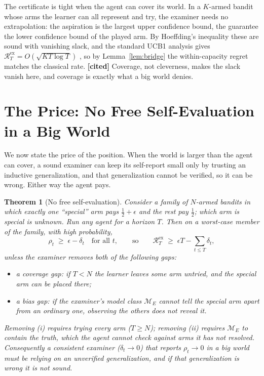 \documentclass[10pt]{article} %
\theoremstyle{definition}
\theoremstyle{plain}
\newtheorem{theorem}{Theorem}
\newcommand{\ModE}{\mathcal{M}_E}
\newcommand{\Rex}{\mathcal{R}^{\mathrm{ex}}}
\begin{document}
The certificate is tight when the agent can cover its world. In a $K$-armed bandit whose arms the learner can all represent and try, the examiner needs no extrapolation: the aspiration is the largest upper confidence bound, the guarantee the lower confidence bound of the played arm. By Hoeffding's inequality these are sound with vanishing slack, and the standard UCB1 analysis gives $\Rex_T = O(\sqrt{KT\log T})$ \citep{auer2002ucb}, so by Lemma~\ref{lem:bridge} the within-capacity regret matches the classical rate. \textbf{[cited]} Coverage, not cleverness, makes the slack vanish here, and coverage is exactly what a big world denies.

\section{The Price: No Free Self-Evaluation in a Big World}
\label{sec:nofree}

We now state the price of the position. When the world is larger than the agent can cover, a sound examiner can keep its self-report small only by trusting an inductive generalization, and that generalization cannot be verified, so it can be wrong. Either way the agent pays.

\begin{theorem}[No free self-evaluation]
\label{thm:nofree}
Consider a family of $N$-armed bandits in which exactly one ``special'' arm pays $\tfrac12+\epsilon$ and the rest pay $\tfrac12$; which arm is special is unknown. Run any agent for a horizon $T$. Then on a worst-case member of the family, with high probability,
\[
\rho_t \;\ge\; \epsilon - \delta_t \quad\text{for all } t, \qquad\text{so}\qquad \Rex_T \;\ge\; \epsilon T - \sum_{t\le T}\delta_t,
\]
unless the examiner removes both of the following gaps:
\begin{itemize}
\item[(i)] \emph{a coverage gap}: if $T < N$ the learner leaves some arm untried, and the special arm can be placed there;
\item[(ii)] \emph{a bias gap}: if the examiner's model class $\ModE$ cannot tell the special arm apart from an ordinary one, observing the others does not reveal it.
\end{itemize}
Removing (i) requires trying every arm ($T \ge N$); removing (ii) requires $\ModE$ to contain the truth, which the agent cannot check against arms it has not resolved. Consequently a consistent examiner ($\delta_t \to 0$) that reports $\rho_t \to 0$ in a big world must be relying on an unverified generalization, and if that generalization is wrong it is not sound.
\end{theorem}
\end{document}
